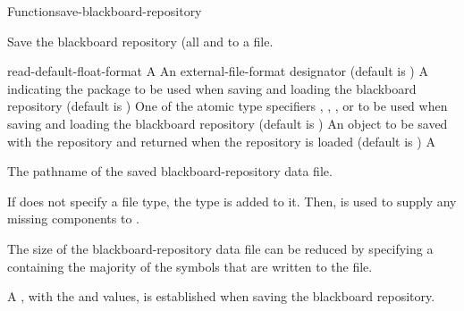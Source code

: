\documentclass[10pt,twoside,english,pdftex]{article}
\begin{document}

\begin{functiondoc}{Function}{save-blackboard-repository}%
  {
                    }
%
% 

\fnsyntax 

\fnpurpose Save the blackboard repository (all  and
 to a file.

\fnpackage {}

\fnmodule {}

\fnargs
\begin{args}{read-default-float-format}
\arg[pathname] A 
 An external-file-format designator (default is
  )
\arg[package] A  indicating the package to be used
when saving and loading the blackboard repository (default is
)
 One of the atomic type specifiers
, ,
, or  to be used when saving
and loading the blackboard repository (default is )
\arg[value] An object to be saved with the repository and returned when the
repository is loaded (default is \nil)
 A 
\end{args}

\fnreturns The pathname of the saved blackboard-repository data file.

\fndescription If  does not specify a file type, the type
 is added to it.  Then,  is used
to supply any missing components to .

The size of the blackboard-repository data file can be reduced by specifying a
 containing the majority of the symbols that are written
to the file.

A , with the
 and  values, is
established when saving the blackboard repository.


\end{functiondoc}
\end{document}
